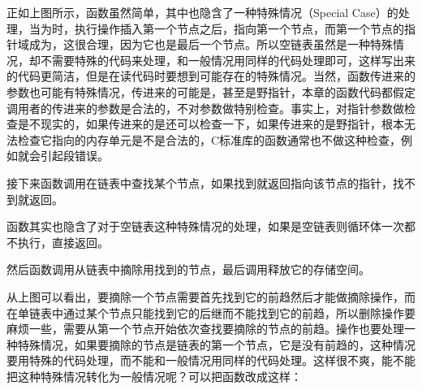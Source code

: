 

正如上图所示，函数虽然简单，其中也隐含了一种特殊情况（Special Case）的处理，当为时，执行操作插入第一个节点之后，指向第一个节点，而第一个节点的指针域成为，这很合理，因为它也是最后一个节点。所以空链表虽然是一种特殊情况，却不需要特殊的代码来处理，和一般情况用同样的代码处理即可，这样写出来的代码更简洁，但是在读代码时要想到可能存在的特殊情况。当然，函数传进来的参数也可能有特殊情况，传进来的可能是，甚至是野指针，本章的函数代码都假定调用者的传进来的参数是合法的，不对参数做特别检查。事实上，对指针参数做检查是不现实的，如果传进来的是还可以检查一下，如果传进来的是野指针，根本无法检查它指向的内存单元是不是合法的，C标准库的函数通常也不做这种检查，例如就会引起段错误。



接下来函数调用在链表中查找某个节点，如果找到就返回指向该节点的指针，找不到就返回。




函数其实也隐含了对于空链表这种特殊情况的处理，如果是空链表则循环体一次都不执行，直接返回。



然后函数调用从链表中摘除用找到的节点，最后调用释放它的存储空间。





从上图可以看出，要摘除一个节点需要首先找到它的前趋然后才能做摘除操作，而在单链表中通过某个节点只能找到它的后继而不能找到它的前趋，所以删除操作要麻烦一些，需要从第一个节点开始依次查找要摘除的节点的前趋。操作也要处理一种特殊情况，如果要摘除的节点是链表的第一个节点，它是没有前趋的，这种情况要用特殊的代码处理，而不能和一般情况用同样的代码处理。这样很不爽，能不能把这种特殊情况转化为一般情况呢？可以把函数改成这样：




